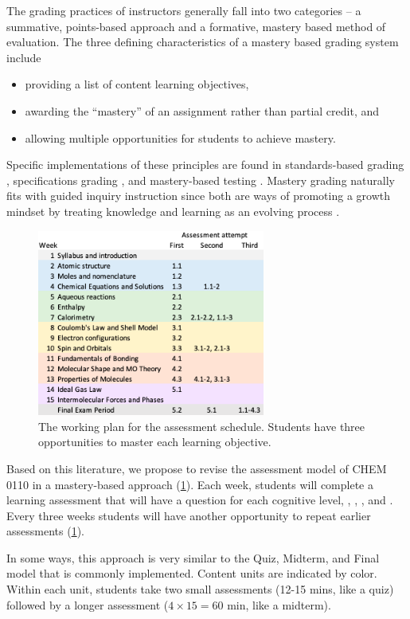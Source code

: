 \documentclass[10pt,letterpaper]{article}
\begin{document}
The grading practices of instructors generally fall into two categories -- a summative, points-based approach and a formative, mastery based method of evaluation. The three defining characteristics of a mastery based grading system include   \citep{Kelly2020} 
\begin{itemize}[nosep]
\item providing a list of content learning objectives, 
\item awarding the
  ``mastery'' of an assignment rather than partial credit, and
  \item allowing multiple opportunities for students to achieve mastery.
\end{itemize}
Specific implementations of these principles are found in standards-based grading \citep{Marzano2011}, specifications grading \citep{Nilson2015}, and mastery-based testing \citep{Collins2019}. Mastery grading naturally fits with guided inquiry instruction since both are ways of promoting a growth mindset by treating knowledge and learning as an evolving process \cite{selbach2020}.


\begin{figure}
\includegraphics[width=7.5cm]{schedule.png}
\caption{\label{fig:schedule}
The working plan for the assessment schedule. Students have three opportunities to master each learning objective.}
\end{figure}

Based on this literature, we propose to revise the assessment model of CHEM 0110 in a mastery-based approach (\cref{fig:schedule}). Each week, students will complete a learning assessment that will have a question for each cognitive level, \recall, \comprehension, \analysis, and \use. Every three weeks students will have another opportunity to repeat earlier assessments (\cref{fig:schedule}). 

In some ways, this approach is very similar to the Quiz, Midterm, and Final model that is commonly implemented. Content units are indicated by color. Within each unit, students take two small assessments (12-15 mins, like a quiz) followed by a longer assessment ($4\times15=60$ min, like a midterm). 
\end{document}
